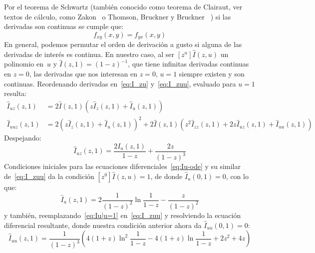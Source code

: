   Por el teorema de Schwartz%
  (también conocido como teorema de Clairaut,%
   ver textos de cálculo,
   como Zakon~\cite{zakon09:_mathem_analy_ii}
   o Thomson, Bruckner y Bruckner~%
     \cite[teorema 12.5]{thomson08:_elemen_real_analy})
  si las derivadas son continuas
  se cumple que:
  \begin{equation*}
    f_{x y} (x, y)
      = f_{y x}(x, y)
  \end{equation*}
  En general,
  podemos permutar el orden de derivación a gusto
  si alguna de las derivadas de interés es continua.
  En nuestro caso,
  al ser \([z^n] \widehat{I}(z, u)\) un polinomio en~\(u\)
  y \(\widehat{I}(z, 1) = (1 - z)^{-1}\),
  que tiene infinitas derivadas continuas en \(z = 0\),
  las derivadas que nos interesan en \(z = 0\), \(u = 1\)
  siempre existen y son continuas.
  Reordenando derivadas en~\eqref{eq:I_zu}
  y~\eqref{eq:I_zuu},
  evaluado para \(u = 1\) resulta:
  \begin{align*}
    \widehat{I}_{u z}(z, 1)
      &= 2 \widehat{I}(z, 1)
	   (z \widehat{I}_z(z, 1) + \widehat{I}_u(z, 1)) \\
    \widehat{I}_{u u z}(z, 1)
      &= 2 (z \widehat{I}_z(z, 1) + \widehat{I}_u(z, 1))^2
	   + 2 \widehat{I}(z, 1)
	       (z^2 \widehat{I}_{z z}(z, 1)
		   + 2 z \widehat{I}_{u z}(z, 1)
		   + \widehat{I}_{u u}(z, 1))
  \end{align*}
  Despejando:
  \begin{equation}
    \label{eq:Iu-ode}
    \widehat{I}_{u z}(z, 1)
      = \frac{2 I_u(z, 1)}{1 - z} + \frac{2 z}{(1 - z)^3}
  \end{equation}
  Condiciones iniciales para las ecuaciones diferenciales~\eqref{eq:Iu-ode}
  y su similar de~\eqref{eq:I_zuu}
  da la condición \([z^0] \widehat{I}(z, u) = 1\),
  de donde \(\widehat{I}_u(0, 1) = 0\),
  con lo que:
  \begin{equation}
    \label{eq:Iu|u=1}
    \widehat{I}_u(z, 1)
      = 2 \frac{1}{(1 - z)^2} \ln \frac{1}{1 - z} - \frac{z}{(1 - z)^2}
  \end{equation}
  y también,
  reemplazando~\eqref{eq:Iu|u=1} en~\eqref{eq:I_zuu}
  y resolviendo la ecuación diferencial resultante,
  donde nuestra condición anterior ahora da \(\widehat{I}_{u u}(0, 1) = 0\):
  \begin{equation}
    \label{eq:Iuu|u=1}
    \widehat{I}_{u u}(z, 1)
      = \frac{1}{(1 - z)^3}
	  \left(
	    4 (1 + z) \ln^2 \frac{1}{1 - z}
	      - 4 (1 + z) \ln \frac{1}{1 - z}
	      + 2 z^2 + 4 z
	  \right)
  \end{equation}

